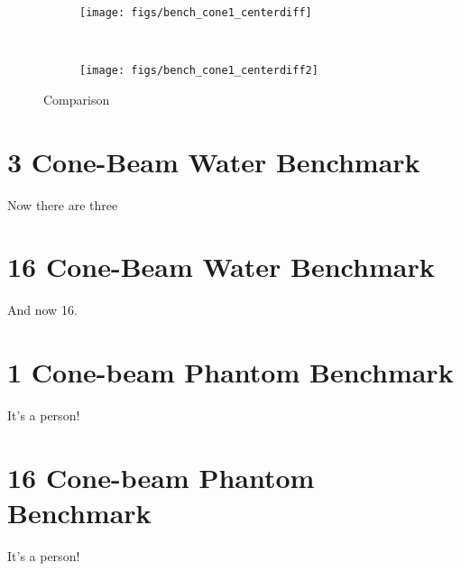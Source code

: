 \begin{figure}
    \centering
    \begin{subfigure}[b]{0.45\textwidth}
        \texttt{[image: figs/bench\_cone1\_centerdiff]}
        \caption{}
        \label{fig:bench_cone1_centerdiff}
    \end{subfigure}
    ~
    \begin{subfigure}[b]{0.45\textwidth}
        \texttt{[image: figs/bench\_cone1\_centerdiff2]}
        \caption{}
        \label{fig:bench_cone1_centerdiff2}
    \end{subfigure}
    \caption{Comparison}\label{fig:bench_cone1_centerdifffig}
\end{figure}

\section{3 Cone-Beam Water Benchmark}

Now there are three

\section{16 Cone-Beam Water Benchmark}

And now 16.

\section{1 Cone-beam Phantom Benchmark}

It's a person!

\section{16 Cone-beam Phantom Benchmark}

It's a person!


\endinput
